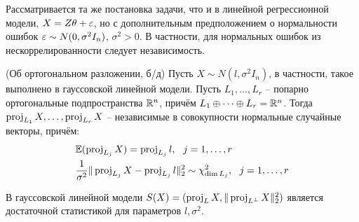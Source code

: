 \begin{definition}
    Рассматривается та же постановка задачи, что и в линейной регрессионной модели, $X = Z \theta + \varepsilon$, но с дополнительным предположением о нормальности ошибок $\varepsilon \sim N(0, \sigma^2 I_n)$, $\sigma^2 > 0$. В частности, для нормальных ошибок из нескоррелированности следует независимость.
\end{definition}

\begin{theorem} (Об ортогональном разложении, б/д)
    Пусть $X \sim N(l, \sigma^2 I_n)$, в частности, такое выполнено в гауссовской линейной модели. Пусть $L_1, \dots, L_r$ -- попарно ортогональные подпространства $\mathbb{R}^n$, причём $L_1 \oplus \dots \oplus L_r = \mathbb{R}^n$. Тогда $\operatorname{proj}_{L_1} X, \dots, \operatorname{proj}_{L_r} X$ -- независимые в совокупности нормальные случайные векторы, причём:
    \begin{align*}
        & \mathbb{E} (\operatorname{proj}_{L_j} X) = \operatorname{proj}_{L_j} l,\ \ j = 1, \dots, r
        \\
        & \frac{1}{\sigma^2} \| \operatorname{proj}_{L_j} X - \operatorname{proj}_{L_j} l \|_2^2 \sim \chi^2_{\dim L_j},\ \ j = 1, \dots, r
    \end{align*}
\end{theorem}

\begin{proposition}
    В гауссовской линейной модели $S(X) = (\operatorname{proj}_L X, \|\operatorname{proj}_{L^\perp} X\|_2^2)$ является достаточной статистикой для параметров $l, \sigma^2$.
\end{proposition}

